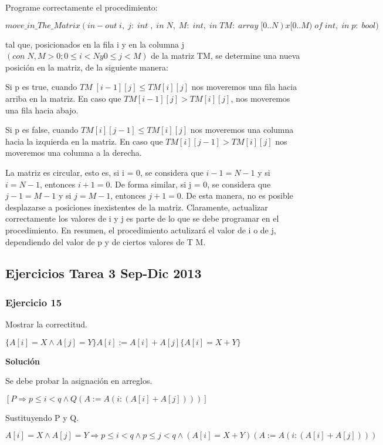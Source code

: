 \documentclass[hidelinks]{article}
\begin{document}
Programe correctamente el procedimiento: \par
$move\_in\_The\_Matrix(in-out\;i,\;j:\;int\;,\;in\;N,\;M:\;int,\;in\;TM:\;array\;[0..N)x[0..M)\;of\;int,\;in\;p:\;bool)$ \par
tal que, posicionados en la fila i y en la columna j $(con \; N, M > 0; 0 \leq
	i < N y 0 \leq j < M )$ de la matriz TM, se determine una nueva posición en la
matriz, de la siguiente manera: \par
Si p es true, cuando $TM \; [i - 1][j] \leq TM [i][j]$ nos moveremos una fila
hacia arriba en la matriz. En caso que $TM [i - 1][j] > T M [i][j]$, nos
moveremos una fila hacia abajo. \par
Si p es false, cuando $TM [i][j - 1] \leq T M [i][j]$ nos moveremos una columna
hacia la izquierda en la matriz. En caso que $TM [i][j - 1] > T M [i][j]$ nos
moveremos una columna a la derecha. \par
La matriz es circular, esto es, si i = 0, se considera que $i - 1 = N - 1$ y si
$i = N - 1$, entonces $i + 1 = 0$. De forma similar, si j = 0, se considera que
$j - 1 = M - 1$ y si $j = M - 1$, entonces $j + 1 = 0$. De esta manera, no es
posible desplazarse a posiciones inexistentes de la matriz. Claramente,
actualizar correctamente los valores de i y j es parte de lo que se debe
programar en el procedimiento. En resumen, el procedimiento actulizará el valor
de i o de j, dependiendo del valor de p y de ciertos valores de T M. \par

\newpage

\subsection{Ejercicios Tarea 3 Sep-Dic 2013}

\subsubsection{Ejercicio 15}


Mostrar la correctitud.\par
$\{ A[i] = X \land A[j] = Y\} A[i] := A[i] + A[j] \{ A[i] = X + Y\}$\par

\textbf{Solución}\par
Se debe probar la asignación en arreglos.\par
$[P \Rightarrow p \leq i < q \land Q(A := A(i:(A[i]+A[j])))]$\par
Sustituyendo P y Q.\par
$A[i] = X \land A[j] = Y \Rightarrow p \leq i < q \land p \leq j < q \land (A[i] = X + Y)(A := A(i:(A[i]+A[j])))$\par
\end{document}
